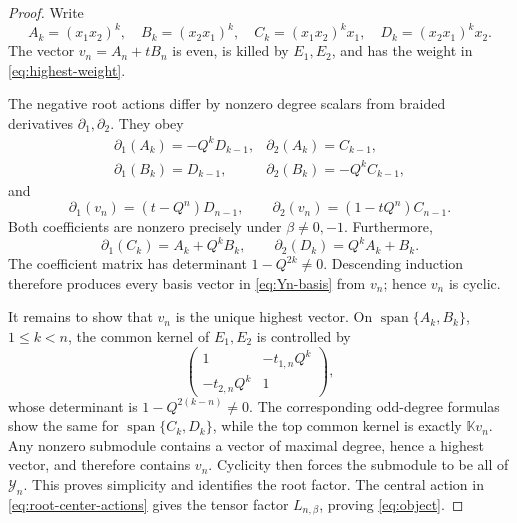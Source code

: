 \documentclass[10pt,a4paper]{amsart}
\newcommand{\hK}{\mathbb K}
\begin{document}
\begin{proof}
Write
\[
 A_k=(x_1x_2)^k,\quad B_k=(x_2x_1)^k,\quad
 C_k=(x_1x_2)^kx_1,\quad D_k=(x_2x_1)^kx_2.
\]
The vector \(v_n=A_n+tB_n\) is even, is killed by \(E_1,E_2\), and has
the weight in \eqref{eq:highest-weight}.

The negative root actions differ by nonzero degree scalars from braided
derivatives \(\partial_1,\partial_2\).  They obey
\[
\begin{array}{ll}
\partial_1(A_k)=-Q^kD_{k-1},&
\partial_2(A_k)=C_{k-1},\\
\partial_1(B_k)=D_{k-1},&
\partial_2(B_k)=-Q^kC_{k-1},
\end{array}
\]
and
\[
 \partial_1(v_n)=(t-Q^n)D_{n-1},\qquad
 \partial_2(v_n)=(1-tQ^n)C_{n-1}.
\]
Both coefficients are nonzero precisely under
\(\beta\neq0,-1\).  Furthermore,
\[
 \partial_1(C_k)=A_k+Q^kB_k,\qquad
 \partial_2(D_k)=Q^kA_k+B_k.
\]
The coefficient matrix has determinant \(1-Q^{2k}\neq0\).
Descending induction therefore produces every basis vector in
\eqref{eq:Yn-basis} from \(v_n\); hence \(v_n\) is cyclic.

It remains to show that \(v_n\) is the unique highest vector.  On
\(\operatorname{span}\{A_k,B_k\}\), \(1\leq k<n\), the common kernel of
\(E_1,E_2\) is controlled by
\[
 \begin{pmatrix}
 1&-t_{1,n}Q^k\\
 -t_{2,n}Q^k&1
 \end{pmatrix},
\]
whose determinant is \(1-Q^{2(k-n)}\neq0\).  The corresponding odd-degree
formulas show the same for \(\operatorname{span}\{C_k,D_k\}\), while the
top common kernel is exactly \(\hK v_n\).  Any nonzero submodule contains
a vector of maximal degree, hence a highest vector, and therefore
contains \(v_n\).  Cyclicity then forces the submodule to be all of
\(\mathcal Y_n\).  This proves simplicity and identifies the root factor.
The central action in \eqref{eq:root-center-actions} gives the tensor
factor \(L_{n,\beta}\), proving \eqref{eq:object}.
\end{proof}
\end{document}
